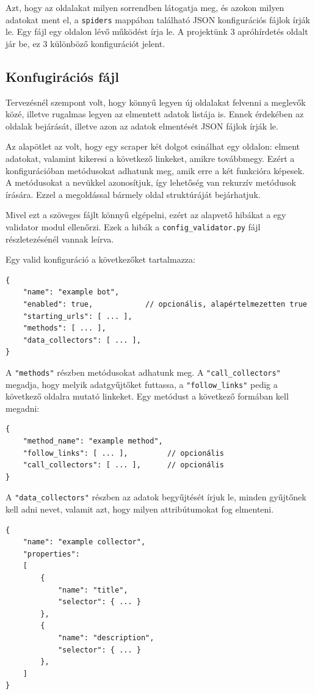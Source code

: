 \documentclass[10pt]{article}
\begin{document}
Azt, hogy az oldalakat milyen sorrendben látogatja meg, és azokon milyen adatokat ment el, a \lstinline{spiders} mappában található JSON konfigurációs fájlok írják le. Egy fájl egy oldalon lévő működést írja le. A projektünk 3 apróhírdetés oldalt jár be, ez 3 különböző konfigurációt jelent.

\subsection{Konfugirációs fájl}
Tervezésnél szempont volt, hogy könnyű legyen új oldalakat felvenni a meglevők közé, illetve rugalmas legyen az elmentett adatok listája is. Ennek érdekében az oldalak bejárását, illetve azon az adatok elmentését  JSON fájlok írják le.

Az alapötlet az volt, hogy egy scraper két dolgot csinálhat egy oldalon: elment adatokat, valamint kikeresi a következő linkeket, amikre továbbmegy. Ezért a konfigurációban metódusokat adhatunk meg, amik erre a két funkcióra képesek. A metódusokat a nevükkel azonosítjuk, így lehetőség van rekurzív metódusok írására. Ezzel a megoldással bármely oldal struktúráját bejárhatjuk. 

Mivel ezt a szöveges fájlt könnyű elgépelni, ezért az alapvető hibákat a egy validator modul ellenőrzi. Ezek a hibák a \lstinline{config_validator.py} fájl részletezésénél vannak leírva.

Egy valid konfiguráció a következőket tartalmazza:
\begin{lstlisting}[frame=single]
{
    "name": "example bot",
    "enabled": true,            // opcionális, alapértelmezetten true 
    "starting_urls": [ ... ],
    "methods": [ ... ],
    "data_collectors": [ ... ],
}
\end{lstlisting}

A \lstinline{"methods"} részben metódusokat adhatunk meg. A \lstinline{"call_collectors"} megadja, hogy melyik adatgyűjtőket futtassa, a \lstinline{"follow_links"} pedig a következő oldalra mutató linkeket. Egy metódust a következő formában kell megadni:
\begin{lstlisting}[frame=single]
{
    "method_name": "example method", 
    "follow_links": [ ... ],         // opcionális
    "call_collectors": [ ... ],      // opcionális
}
\end{lstlisting}

A \lstinline{"data_collectors"} részben az adatok begyűjtését írjuk le, minden gyűjtőnek kell adni nevet, valamit azt, hogy milyen attribútumokat fog elmenteni.
\begin{lstlisting}[frame=single]
{
    "name": "example collector",
    "properties":
    [
        {
            "name": "title",
            "selector": { ... }
        },
        {
            "name": "description",
            "selector": { ... }
        },
    ]
}
\end{lstlisting}
\end{document}
